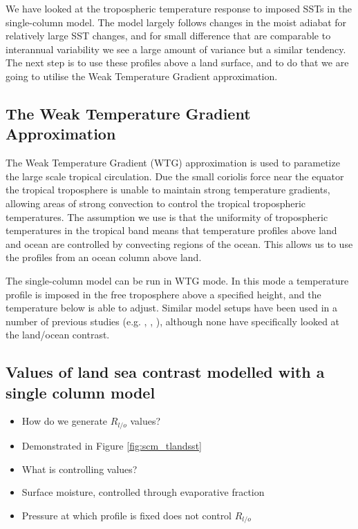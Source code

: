 We have looked at the tropospheric temperature response to imposed SSTs in the 
single-column model. The model largely follows changes in the moist adiabat for 
relatively large SST changes, and for small difference that are comparable to 
interannual variability we see a large amount of variance but a similar 
tendency. The next step is to use these profiles above a land surface, and to do 
that we are going to utilise the Weak Temperature Gradient approximation.

\subsection{The Weak Temperature Gradient Approximation}
The Weak Temperature Gradient (WTG) approximation is used to parametize the 
large scale tropical circulation. Due the small coriolis force near the equator 
the tropical troposphere is unable to maintain strong temperature gradients, 
allowing areas of strong convection to control the tropical tropospheric 
temperatures.  The assumption we use is that the uniformity of tropospheric 
temperatures in the tropical band means that temperature profiles above land and 
ocean are controlled by convecting regions of the ocean. This allows us to use 
the profiles from an ocean column above land.

The single-column model can be run in WTG mode. In this mode a temperature 
profile is imposed in the free troposphere above a specified height, and the 
temperature below is able to adjust. Similar model setups have been used in a 
number of previous studies (e.g. \citet{Sobel2000}, \citet{Lintner2005}, 
\citet{Ramsay2011}), although none have specifically looked at the land/ocean 
contrast.

\subsection{Values of land sea contrast modelled with a single column model}
\label{sec:scmrlo}
\begin{itemize}
	\item How do we generate $R_{l/o}$ values?
	\item Demonstrated in Figure \ref{fig:scm_tlandsst}
	\item What is controlling values?
	\item Surface moisture, controlled through evaporative fraction
	\item Pressure at which profile is fixed does not control $R_{l/o}$
\end{itemize}

